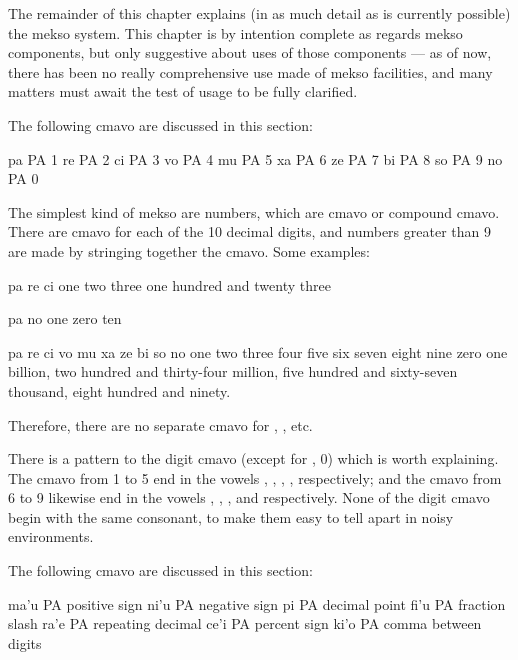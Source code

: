 The remainder of this chapter explains (in as much detail as
    is currently possible) the mekso system. This chapter is by
    intention complete as regards mekso components, but only
    suggestive about uses of those components --- as of now, there
    has been no really comprehensive use made of mekso facilities,
    and many matters must await the test of usage to be fully
    clarified.



The following cmavo are discussed in this section:

   pa  PA  1
    re  PA  2
    ci  PA  3
    vo  PA  4
    mu  PA  5
    xa  PA  6
    ze  PA  7
    bi  PA  8
    so  PA  9
    no  PA  0           

The simplest kind of mekso are numbers, which are cmavo or
    compound cmavo. There are cmavo for each of the 10 decimal
    digits, and numbers greater than 9 are made by stringing
    together the cmavo. Some examples:
\begin{example}
pa re ci\n
one two three\n
one hundred and twenty three
\end{example}

\begin{example}
pa no\n
one zero\n
ten
\end{example}

\begin{example}
pa re ci vo mu xa ze bi so no\n
one two three four five six seven eight nine zero\n
one billion, two hundred and thirty-four million,\n
\T	five hundred and sixty-seven thousand,\n
\T	eight hundred and ninety.
\end{example}

Therefore, there are no separate cmavo for ,
    , etc. 

There is a pattern to the digit cmavo (except for , 0)
    which is worth explaining. The cmavo from 1 to 5 end in the
    vowels , , , ,  respectively; and the
    cmavo from 6 to 9 likewise end in the vowels , ,
    , and  respectively. None of the digit cmavo begin
    with the same consonant, to make them easy to tell apart in
    noisy environments.



The following cmavo are discussed in this section:

   ma'u    PA  positive sign
    ni'u    PA  negative sign
    pi  PA  decimal point
    fi'u    PA  fraction slash
    ra'e    PA  repeating decimal
    ce'i    PA  percent sign
    ki'o    PA  comma between digits

